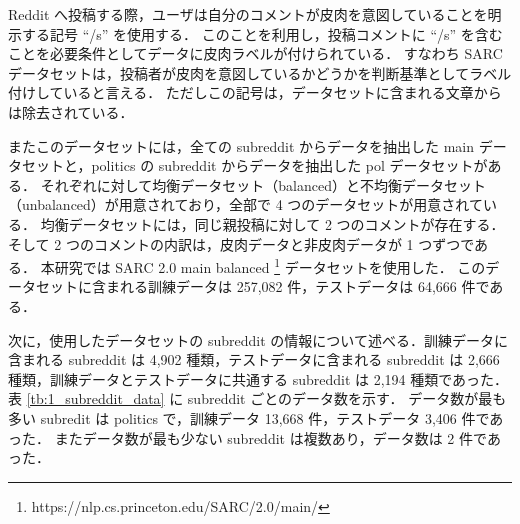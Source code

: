 Reddit へ投稿する際，ユーザは自分のコメントが皮肉を意図していることを明示する記号 “/s” を使用する．
このことを利用し，投稿コメントに “/s” を含むことを必要条件としてデータに皮肉ラベルが付けられている．
すなわち SARC データセットは，投稿者が皮肉を意図しているかどうかを判断基準としてラベル付けしていると言える．
ただしこの記号は，データセットに含まれる文章からは除去されている．
\par
またこのデータセットには，全ての subreddit からデータを抽出した main データセットと，politics の subreddit からデータを抽出した pol データセットがある．
それぞれに対して均衡データセット（balanced）と不均衡データセット（unbalanced）が用意されており，全部で 4 つのデータセットが用意されている．
均衡データセットには，同じ親投稿に対して 2 つのコメントが存在する．
そして 2 つのコメントの内訳は，皮肉データと非皮肉データが 1 つずつである．
本研究では SARC 2.0 main balanced \footnote{https://nlp.cs.princeton.edu/SARC/2.0/main/} データセットを使用した．
このデータセットに含まれる訓練データは 257,082 件，テストデータは 64,666 件である．
\par
次に，使用したデータセットの subreddit の情報について述べる．訓練データに含まれる subreddit は 4,902 種類，テストデータに含まれる subreddit は 2,666 種類，訓練データとテストデータに共通する subreddit は 2,194 種類であった．
表 \ref{tb:1_subreddit_data} に subreddit ごとのデータ数を示す．
データ数が最も多い subredit は politics で，訓練データ 13,668 件，テストデータ 3,406 件であった．
またデータ数が最も少ない subreddit は複数あり，データ数は 2 件であった．


